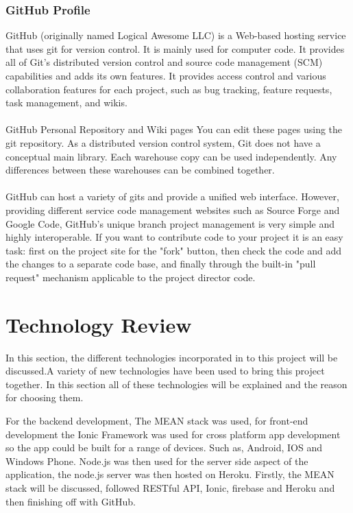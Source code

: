 \subsection{GitHub Profile}
GitHub (originally named Logical Awesome LLC) is a Web-based hosting service that uses git for version control. It is mainly used for computer code. It provides all of Git's distributed version control and source code management (SCM) capabilities and adds its own features. It provides access control and various collaboration features for each project, such as bug tracking, feature requests, task management, and wikis. \\ \\ GitHub Personal Repository and Wiki pages You can edit these pages using the git repository. As a distributed version control system, Git does not have a conceptual main library. Each warehouse copy can be used independently. Any differences between these warehouses can be combined together. \\ \\ GitHub can host a variety of gits and provide a unified web interface. However, providing different service code management websites such as Source Forge and Google Code, GitHub's unique branch project management is very simple and highly interoperable. If you want to contribute code to your project it is an easy task: first on the project site for the "fork" button, then check the code and add the changes to a separate code base, and finally through the built-in "pull request" mechanism applicable to the project director code.




\chapter{Technology Review}
In this section, the different technologies incorporated in to this project will be discussed.A variety of new technologies have been used to bring this project together. In this section all of these technologies will be explained and the reason for choosing them.

For the backend development, The MEAN stack was used, for front-end development the Ionic Framework was used for cross platform app development so the app could be built for a range of devices. Such as, Android, IOS and Windows Phone. Node.js was then used for the server side aspect of the application, the node.js server was then hosted on Heroku. Firstly, the MEAN stack will be discussed, followed RESTful API, Ionic, firebase and Heroku and then finishing off with GitHub. 

